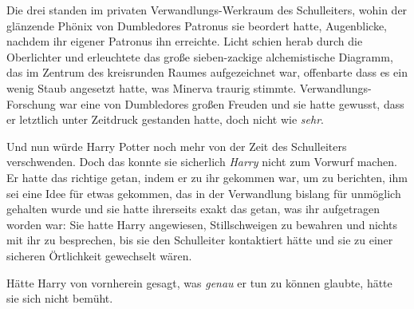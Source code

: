 Die drei standen im privaten Verwandlungs-Werkraum des Schulleiters, wohin der glänzende Phönix von Dumbledores Patronus sie beordert hatte, Augenblicke, nachdem ihr eigener Patronus ihn erreichte. Licht schien herab durch die Oberlichter und erleuchtete das große sieben-zackige alchemistische Diagramm, das im Zentrum des kreisrunden Raumes aufgezeichnet war, offenbarte dass es ein wenig Staub angesetzt hatte, was Minerva traurig stimmte. Verwandlungs-Forschung war eine von Dumbledores großen Freuden und sie hatte gewusst, dass er letztlich unter Zeitdruck gestanden hatte, doch nicht wie \emph{sehr}.

Und nun würde Harry Potter noch mehr von der Zeit des Schulleiters verschwenden. Doch das konnte sie sicherlich \emph{Harry} nicht zum Vorwurf machen. Er hatte das richtige getan, indem er zu ihr gekommen war, um zu berichten, ihm sei eine Idee für etwas gekommen, das in der Verwandlung bislang für unmöglich gehalten wurde und sie hatte ihrerseits exakt das getan, was ihr aufgetragen worden war: Sie hatte Harry angewiesen, Stillschweigen zu bewahren und nichts mit ihr zu besprechen, bis sie den Schulleiter kontaktiert hätte und sie zu einer sicheren Örtlichkeit gewechselt wären.

Hätte Harry von vornherein gesagt, was \emph{genau} er tun zu können glaubte, hätte sie sich nicht bemüht.

